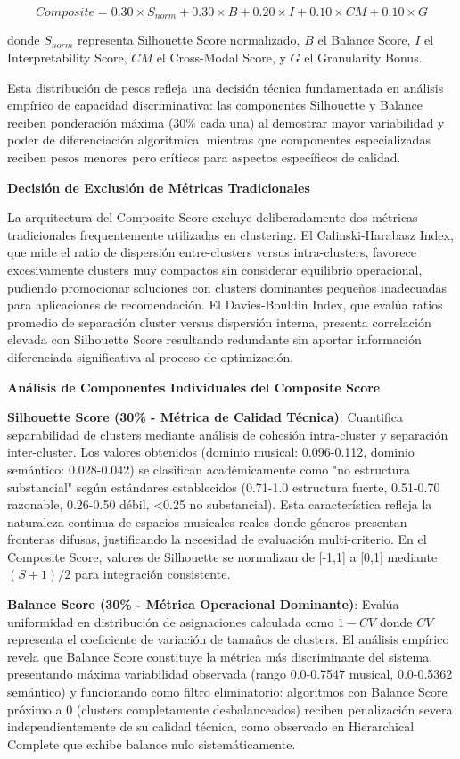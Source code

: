 \documentclass[12pt,a4paper]{report}
\begin{document}
$$Composite = 0.30 \times S_{norm} + 0.30 \times B + 0.20 \times I + 0.10 \times CM + 0.10 \times G$$

donde $S_{norm}$ representa Silhouette Score normalizado, $B$ el Balance Score, $I$ el Interpretability Score, $CM$ el Cross-Modal Score, y $G$ el Granularity Bonus.

Esta distribución de pesos refleja una decisión técnica fundamentada en análisis empírico de capacidad discriminativa: las componentes Silhouette y Balance reciben ponderación máxima (30\% cada una) al demostrar mayor variabilidad y poder de diferenciación algorítmica, mientras que componentes especializadas reciben pesos menores pero críticos para aspectos específicos de calidad.

\textbf{Decisión de Exclusión de Métricas Tradicionales}

La arquitectura del Composite Score excluye deliberadamente dos métricas tradicionales frequentemente utilizadas en clustering. El Calinski-Harabasz Index, que mide el ratio de dispersión entre-clusters versus intra-clusters, favorece excesivamente clusters muy compactos sin considerar equilibrio operacional, pudiendo promocionar soluciones con clusters dominantes pequeños inadecuadas para aplicaciones de recomendación. El Davies-Bouldin Index, que evalúa ratios promedio de separación cluster versus dispersión interna, presenta correlación elevada con Silhouette Score resultando redundante sin aportar información diferenciada significativa al proceso de optimización.

\textbf{Análisis de Componentes Individuales del Composite Score}

\textbf{Silhouette Score (30\% - Métrica de Calidad Técnica)}: Cuantifica separabilidad de clusters mediante análisis de cohesión intra-cluster y separación inter-cluster. Los valores obtenidos (dominio musical: 0.096-0.112, dominio semántico: 0.028-0.042) se clasifican académicamente como "no estructura substancial" según estándares establecidos (0.71-1.0 estructura fuerte, 0.51-0.70 razonable, 0.26-0.50 débil, <0.25 no substancial). Esta característica refleja la naturaleza continua de espacios musicales reales donde géneros presentan fronteras difusas, justificando la necesidad de evaluación multi-criterio. En el Composite Score, valores de Silhouette se normalizan de [-1,1] a [0,1] mediante $(S + 1)/2$ para integración consistente.

\textbf{Balance Score (30\% - Métrica Operacional Dominante)}: Evalúa uniformidad en distribución de asignaciones calculada como $1 - CV$ donde $CV$ representa el coeficiente de variación de tamaños de clusters. El análisis empírico revela que Balance Score constituye la métrica más discriminante del sistema, presentando máxima variabilidad observada (rango 0.0-0.7547 musical, 0.0-0.5362 semántico) y funcionando como filtro eliminatorio: algoritmos con Balance Score próximo a 0 (clusters completamente desbalanceados) reciben penalización severa independientemente de su calidad técnica, como observado en Hierarchical Complete que exhibe balance nulo sistemáticamente.
\end{document}
